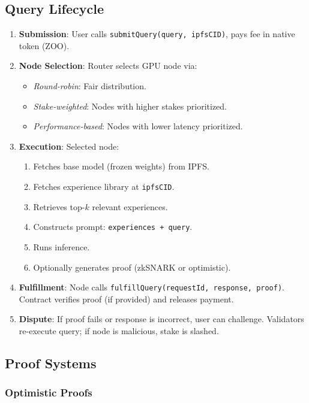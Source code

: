 \documentclass[11pt,a4paper]{article}
\begin{document}
\subsection{Query Lifecycle}

\begin{enumerate}
\item \textbf{Submission}: User calls \texttt{submitQuery(query, ipfsCID)}, pays fee in native token (ZOO).
\item \textbf{Node Selection}: Router selects GPU node via:
   \begin{itemize}
   \item \textit{Round-robin}: Fair distribution.
   \item \textit{Stake-weighted}: Nodes with higher stakes prioritized.
   \item \textit{Performance-based}: Nodes with lower latency prioritized.
   \end{itemize}
\item \textbf{Execution}: Selected node:
   \begin{enumerate}
   \item Fetches base model (frozen weights) from IPFS.
   \item Fetches experience library at \texttt{ipfsCID}.
   \item Retrieves top-$k$ relevant experiences.
   \item Constructs prompt: \texttt{experiences + query}.
   \item Runs inference.
   \item Optionally generates proof (zkSNARK or optimistic).
   \end{enumerate}
\item \textbf{Fulfillment}: Node calls \texttt{fulfillQuery(requestId, response, proof)}. Contract verifies proof (if provided) and releases payment.
\item \textbf{Dispute}: If proof fails or response is incorrect, user can challenge. Validators re-execute query; if node is malicious, stake is slashed.
\end{enumerate}

\subsection{Proof Systems}

\subsubsection{Optimistic Proofs}
\end{document}
